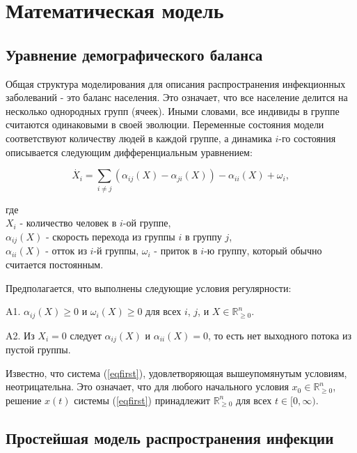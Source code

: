 \documentclass[a4paper]{report}
\begin{document}
	
	\chapter{Математическая модель}

	\section{Уравнение демографического баланса}
	Общая структура моделирования для описания распространения инфекционных заболеваний - это баланс населения. Это означает, что все население делится на несколько однородных групп (ячеек). Иными словами, все индивиды в группе считаются одинаковыми в своей эволюции. Переменные состояния модели соответствуют количеству людей в каждой группе, а динамика $i$-го состояния описывается следующим дифференциальным уравнением:
	
	\begin{equation} \label{eqfirst}
	\dot{X_i} = \sum_{i \neq j} (\alpha_{ij}(X) - \alpha_{ji}(X)) - \alpha_{ii}(X) + \omega_i,
	\end{equation}
	
	
	где \\
	$X_i$ - количество человек в $i$-ой группе, \\
	$\alpha_{ij}(X)$ - скорость перехода из группы $i$ в группу $j$, \\
	$\alpha_{ii}(X)$ - отток из $i$-й группы, $\omega_i$ - приток в $i$-ю группу, который обычно считается постоянным.
	
	Предполагается, что выполнены следующие условия регулярности:
	
	A1. $\alpha_{ij}(X) \geq 0$ и $\omega_i(X) \geq 0$ для всех $i$, $j$, и $X \in \mathbb{R}^n_{\geq 0}$.
	
	A2. Из $X_i = 0$ следует  $\alpha_{ij}(X)$ и $\alpha_{ii}(X) = 0$, то есть нет выходного потока из пустой группы.
	
	
	Известно, что система (\ref{eqfirst}), удовлетворяющая вышеупомянутым условиям, неотрицательна.  Это означает, что для любого начального условия $x_0 \in \mathbb{R}^n_{\geq 0}$, решение $x(t)$ системы (\ref{eqfirst}) принадлежит $\mathbb{R}^n_{\geq 0}$ для всех $t \in [0, \infty)$.	
	
	
		
	\section{Простейшая модель распространения инфекции}
	
\end{document}
